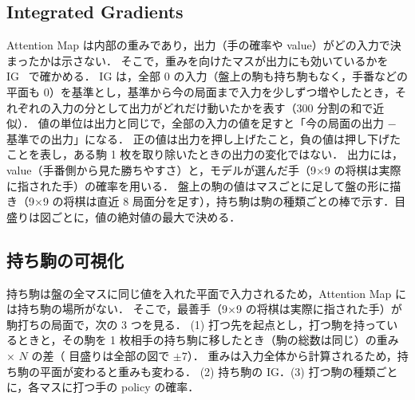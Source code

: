\documentclass[submit]{ipsj}
\begin{document}
\subsection{Integrated Gradients}
\label{sec:ig}
Attention Map は内部の重みであり，出力（手の確率や value）がどの入力で決まったかは示さない．
そこで，重みを向けたマスが出力にも効いているかを IG~\cite{ig} で確かめる．
IG は，全部 0 の入力（盤上の駒も持ち駒もなく，手番などの平面も 0）を基準とし，基準から今の局面まで入力を少しずつ増やしたとき，それぞれの入力の分として出力がどれだけ動いたかを表す（300 分割の和で近似）．
値の単位は出力と同じで，全部の入力の値を足すと「今の局面の出力 − 基準での出力」になる．
正の値は出力を押し上げたこと，負の値は押し下げたことを表し，ある駒 1 枚を取り除いたときの出力の変化ではない．
出力には，value（手番側から見た勝ちやすさ）と，モデルが選んだ手（9×9 の将棋は実際に指された手）の確率を用いる．
盤上の駒の値はマスごとに足して盤の形に描き（9×9 の将棋は直近 8 局面分を足す），持ち駒は駒の種類ごとの棒で示す．目盛りは図ごとに，値の絶対値の最大で決める．

\subsection{持ち駒の可視化}
持ち駒は盤の全マスに同じ値を入れた平面で入力されるため，Attention Map には持ち駒の場所がない．
そこで，最善手（9×9 の将棋は実際に指された手）が駒打ちの局面で，次の 3 つを見る．
(1) 打つ先を起点とし，打つ駒を持っているときと，その駒を 1 枚相手の持ち駒に移したとき（駒の総数は同じ）の重み × $N$ の差（%
目盛りは全部の図で $\pm 7$）．
重みは入力全体から計算されるため，持ち駒の平面が変わると重みも変わる．
(2) 持ち駒の IG．(3) 打つ駒の種類ごとに，各マスに打つ手の policy の確率．

\end{document}
